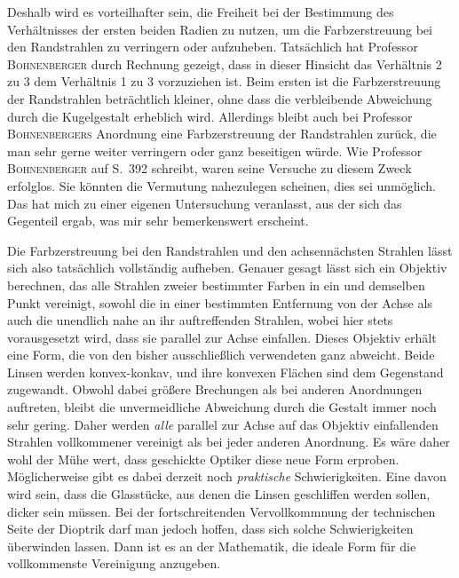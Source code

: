 Deshalb wird es vorteilhafter sein, die Freiheit bei der Bestimmung des Verhältnisses der ersten beiden Radien zu nutzen, um die Farbzerstreuung bei den Randstrahlen zu verringern oder aufzuheben. Tatsächlich hat Professor \textsc{Bohnenberger} durch Rechnung gezeigt, dass in dieser Hinsicht das Verhältnis 2 zu 3 dem Verhältnis 1 zu 3 vorzuziehen ist. Beim ersten ist die Farbzerstreuung der Randstrahlen beträchtlich kleiner, ohne dass die verbleibende Abweichung durch die Kugelgestalt erheblich wird. Allerdings bleibt auch bei Professor \textsc{Bohnenbergers} Anordnung eine Farbzerstreuung der Randstrahlen zurück,
die man sehr gerne weiter verringern oder ganz beseitigen würde. Wie Professor \textsc{Bohnenberger} auf S.\ 392 schreibt, waren seine Versuche zu diesem Zweck erfolglos. Sie könnten die Vermutung nahezulegen scheinen, dies sei unmöglich. Das hat mich zu einer eigenen Untersuchung veranlasst, aus der sich das Gegenteil ergab, was mir sehr bemerkenswert erscheint.

Die Farbzerstreuung bei den Randstrahlen und den achsennächsten Strahlen lässt sich also tatsächlich vollständig aufheben. Genauer gesagt lässt sich ein Objektiv berechnen, das alle Strahlen zweier bestimmter Farben in ein und demselben Punkt vereinigt, sowohl die in einer bestimmten Entfernung von der Achse als auch die unendlich nahe an ihr auftreffenden Strahlen, wobei hier stets vorausgesetzt wird, dass sie parallel zur Achse einfallen. Dieses Objektiv erhält eine Form, die von den bisher ausschließlich verwendeten ganz abweicht. Beide Linsen werden konvex-konkav, und ihre konvexen Flächen sind dem Gegenstand zugewandt. Obwohl dabei größere Brechungen als bei anderen Anordnungen auftreten, bleibt die unvermeidliche Abweichung durch die Gestalt immer noch sehr gering. Daher werden \textit{alle} parallel zur Achse auf das Objektiv einfallenden Strahlen vollkommener vereinigt als bei jeder anderen Anordnung. Es wäre daher wohl der Mühe wert, dass geschickte Optiker diese neue Form erproben. Möglicherweise gibt es dabei derzeit noch \textit{praktische} Schwierigkeiten. Eine davon wird sein, dass die Glasstücke, aus denen die Linsen geschliffen werden sollen, dicker sein müssen. Bei der fortschreitenden Vervollkommnung der technischen Seite der Dioptrik darf man jedoch hoffen, dass sich solche Schwierigkeiten überwinden lassen. Dann ist es an der Mathematik, die ideale Form für die vollkommenste Vereinigung anzugeben.

